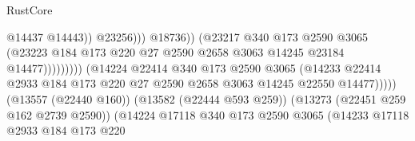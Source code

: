 \begin{lexlean}{RustCore}
\begin{coremodule}
                                                              @14437
                                                              @14443))
                                                          @23256)))
                                                    @18736))
                                                (@23217
                                                  @340
                                                  @173
                                                  @2590
                                                  @3065
                                                  (@23223
                                                    @184
                                                    @173
                                                    @220
                                                    @27
                                                    @2590
                                                    @2658
                                                    @3063
                                                    @14245
                                                    @23184
                                                    @14477)))))))))
                                  (@14224
                                    @22414
                                    @340
                                    @173
                                    @2590
                                    @3065
                                    (@14233
                                      @22414
                                      @2933
                                      @184
                                      @173
                                      @220
                                      @27
                                      @2590
                                      @2658
                                      @3063
                                      @14245
                                      @22550
                                      @14477)))))
                            (@13557 (@22440 @160))
                            (@13582 (@22444 @593 @259))
                            (@13273 (@22451 @259 @162 @2739 @2590))
                            (@14224
                              @17118
                              @340
                              @173
                              @2590
                              @3065
                              (@14233
                                @17118
                                @2933
                                @184
                                @173
                                @220

\end{coremodule}
\end{lexlean}

